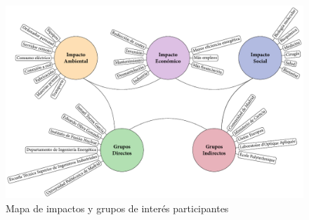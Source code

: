 \begin{figure}[htbp]
  \centering
  \includegraphics[width=\textwidth]{Figuras/ch6_impcts.pdf}
  \caption{Mapa de impactos y grupos de interés participantes}
  \label{fig:6.1}
\end{figure}
